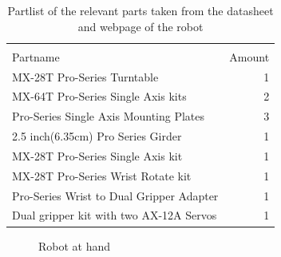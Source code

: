\begin{table}[h]
\centering
\caption{Partlist of the relevant parts taken from the datasheet and webpage of the robot}
\label{table:partlist}
    \begin{tabular}{ l r}
        \hline \\[-1em]
        Partname  & Amount \\
        \hline
        MX-28T Pro-Series Turntable & 1\\
        MX-64T Pro-Series Single Axis kits& 2\\
        Pro-Series Single Axis Mounting Plates & 3\\
        2.5 inch(6.35cm) Pro Series Girder & 1 \\
        MX-28T Pro-Series Single Axis kit & 1 \\
        MX-28T Pro-Series Wrist Rotate kit & 1\\
        Pro-Series Wrist to Dual Gripper Adapter & 1\\
        Dual gripper kit with two AX-12A Servos& 1\\
               \hline
    \end{tabular}
\end{table}



\begin{figure}[htbp]
  \centering
  
  \caption{Robot at hand}
  \label{fig:utgangspunkt}
\end{figure}



